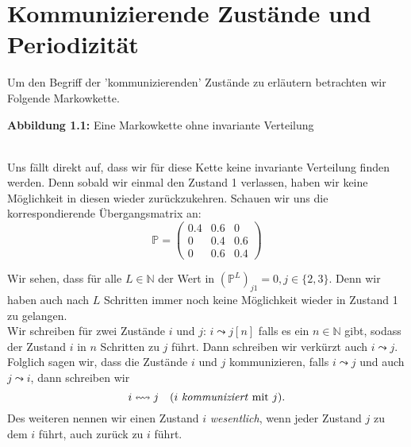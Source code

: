 \documentclass[a4paper]{article}
\begin{document}
\section{Kommunizierende Zustände und Periodizität}

Um den Begriff der 'kommunizierenden' Zustände zu erläutern betrachten wir Folgende Markowkette.

\begin{center}
\end{center}
\qquad \caption{\textbf{Abbildung 1.1:} Eine Markowkette ohne invariante Verteilung}
\\

Uns fällt direkt auf, dass wir für diese Kette keine invariante Verteilung finden werden. 
Denn sobald wir einmal den Zustand 1 verlassen, haben wir keine Möglichkeit in diesen wieder
zurückzukehren.
Schauen wir uns die korrespondierende Übergangsmatrix an:
\[
\mathbb{P} = \begin{pmatrix} 
	0.4 & 0.6 & 0 \\
	0 & 0.4 & 0.6 \\
	0 & 0.6 & 0.4
\end{pmatrix} 
\]

Wir sehen, dass für alle $L \in \mathbb{N}$ der Wert in $(\mathbb{P} ^{L}) _{j1} = 0, j \in \{
	2, 3
\} $. 
Denn wir haben auch nach $L$ Schritten immer noch keine Möglichkeit wieder in Zustand 1 zu gelangen.
\\

Wir schreiben für zwei Zustände $i$ und $j$: $i \leadsto j [n]$ falls es ein $n \in \mathbb{N}$ gibt, sodass
der Zustand $i$ in $n$ Schritten zu $j$ führt. Dann schreiben wir verkürzt auch $i \leadsto j$.
Folglich sagen wir, dass die Zustände $i$ und $j$ kommunizieren, falls $i \leadsto j$ und auch
$j \leadsto i$, dann schreiben wir
\[
	i \leftrightsquigarrow j \quad \text{($i$ \textit{kommuniziert} mit $j$)}.
\]
Des weiteren nennen wir einen Zustand $i$ \textit{wesentlich}, wenn jeder Zustand $j$ zu dem $i$ führt, auch
zurück zu $i$ führt. 
\\
\end{document}
